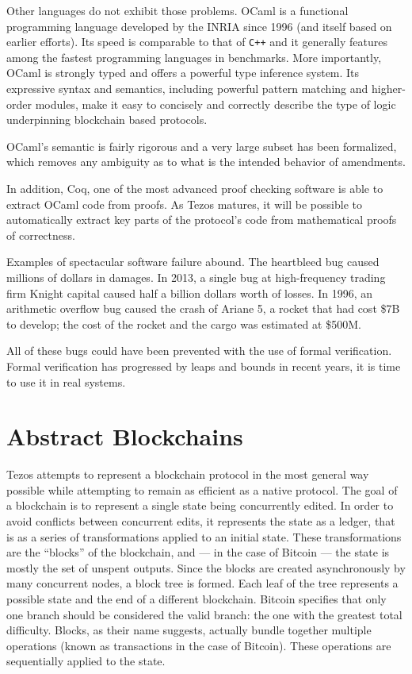 \documentclass[letterpaper]{article}
\begin{document}
Other languages do not exhibit those problems. OCaml is a functional programming
language developed by the INRIA since 1996 (and itself based on earlier
efforts). Its speed is comparable to that of \verb!C++! and it generally
features among the fastest programming languages in benchmarks\cite{shootout}.
More importantly, OCaml is strongly typed and offers a powerful type inference
system. Its expressive syntax and semantics, including powerful pattern matching
and higher-order modules, make it easy to concisely and correctly describe the
type of logic underpinning blockchain based protocols.

OCaml's semantic is fairly rigorous and a very large subset has been
formalized\cite{semantic}, which removes any ambiguity as to what is the
intended behavior of amendments.

In addition, Coq, one of the most advanced proof checking software
is able to extract OCaml code from proofs. As Tezos matures, it will be
possible to automatically extract key parts of the protocol's code from
mathematical proofs of correctness.

Examples of spectacular software failure abound. The heartbleed bug caused
millions of dollars in damages. In 2013, a single bug at high-frequency trading
firm Knight capital caused half a billion dollars worth of losses. In 1996, an
arithmetic overflow bug caused the crash of Ariane 5, a rocket that had cost
\$7B to develop; the cost of the rocket and the cargo was estimated at \$500M.

All of these bugs could have been prevented with the use of formal verification.
Formal verification has progressed by leaps and bounds in recent years,
it is time to use it in real systems.

\section{Abstract Blockchains}

Tezos attempts to represent a blockchain protocol in the most general way
possible while attempting to remain as efficient as a native protocol.
The goal of a blockchain is to represent a single state being concurrently
edited. In order to avoid conflicts between concurrent edits, it represents the
state as a ledger, that is as a series of transformations applied to an initial
state. These transformations are the ``blocks'' of the blockchain, and --- in
the case of Bitcoin --- the state is mostly the set of unspent outputs. Since
the blocks are created asynchronously by many concurrent nodes, a block tree is
formed. Each leaf of the tree represents a possible state and the end of a
different blockchain. Bitcoin specifies that only one branch should be
considered the valid branch: the one with the greatest total difficulty.
Blocks, as their name suggests, actually bundle together
multiple operations (known as transactions in the case of Bitcoin).
These operations are sequentially applied to the state.
\end{document}
